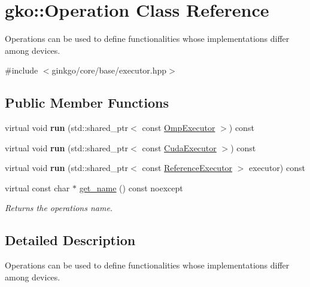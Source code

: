 \hypertarget{classgko_1_1Operation}{}\section{gko\+:\+:Operation Class Reference}
\label{classgko_1_1Operation}


Operations can be used to define functionalities whose implementations differ among devices.  




{\ttfamily \#include $<$ginkgo/core/base/executor.\+hpp$>$}

\subsection*{Public Member Functions}
\begin{DoxyCompactItemize}
\item 
\mbox{\label{classgko_1_1Operation_a2b5cd402406c1749b23df06be6d53637}} 
virtual void {\bfseries run} (std\+::shared\+\_\+ptr$<$ const \hyperlink{classgko_1_1OmpExecutor}{Omp\+Executor} $>$) const
\item 
\mbox{\label{classgko_1_1Operation_aa09b89cdd9526e2654aedb5b83b8b5ef}} 
virtual void {\bfseries run} (std\+::shared\+\_\+ptr$<$ const \hyperlink{classgko_1_1CudaExecutor}{Cuda\+Executor} $>$) const
\item 
\mbox{\label{classgko_1_1Operation_ae67f83384d2df18660c2bac839a4bec3}} 
virtual void {\bfseries run} (std\+::shared\+\_\+ptr$<$ const \hyperlink{classgko_1_1ReferenceExecutor}{Reference\+Executor} $>$ executor) const
\item 
virtual const char $\ast$ \hyperlink{classgko_1_1Operation_ab3b940849d1daf02830f3387c52888d0}{get\+\_\+name} () const noexcept
\begin{DoxyCompactList}\small\item\em Returns the operation\textquotesingle{}s name. \end{DoxyCompactList}\end{DoxyCompactItemize}


\subsection{Detailed Description}
Operations can be used to define functionalities whose implementations differ among devices. 

